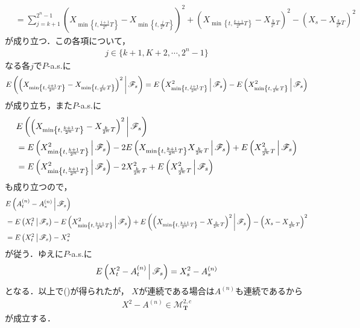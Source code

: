 \begin{sketch}
\begin{description}
\begin{align}
					&= \sum_{j=k+1}^{2^n-1} \left(X_{\min\left\{t,\frac{j+1}{2^n}T\right\}} - X_{\min\left\{t,\frac{j}{2^n}T\right\}}\right)^2
					+ \left(X_{\min\left\{t,\frac{k+1}{2^n}T\right\}} - X_{\frac{k}{2^n}T}\right)^2
					- \left(X_s - X_{\frac{k}{2^n}T}\right)^2
				\end{align}
				が成り立つ．この各項について，
				\begin{align}
					j \in \{k+1,K+2,\cdots,2^n-1\}
				\end{align}
				なる各$j$で$P$-a.s.に
				\begin{align}
					E\left(  \left(X_{\min\left\{t,\frac{j+1}{2^n}T\right\}} - X_{\min\left\{t,\frac{j}{2^n}T\right\}}\right)^2 \, \middle|\, \mathscr{F}_s \right)
					= E\left( X^2_{\min\left\{t,\frac{j+1}{2^n}T\right\}} \, \middle|\, \mathscr{F}_s \right)
					 - E\left( X^2_{\min\left\{t,\frac{j}{2^n}T\right\}} \, \middle|\, \mathscr{F}_s \right)
				\end{align}
				が成り立ち，また$P$-a.s.に
				\begin{align}
					&E\left( \left(X_{\min\left\{t,\frac{k+1}{2^n}T\right\}} - X_{\frac{k}{2^n}T}\right)^2 \, \middle|\, \mathscr{F}_s \right) \\
					&= E\left( X_{\min\left\{t,\frac{k+1}{2^n}T\right\}}^2 \, \middle|\, \mathscr{F}_s \right)
					- 2 E\left( X_{\min\left\{t,\frac{k+1}{2^n}T\right\}}X_{\frac{k}{2^n}T} \, \middle|\, \mathscr{F}_s \right)
					+ E\left( X_{\frac{k}{2^n}T}^2 \, \middle|\, \mathscr{F}_s \right) \\
					&= E\left( X_{\min\left\{t,\frac{k+1}{2^n}T\right\}}^2 \, \middle|\, \mathscr{F}_s \right)
					- 2 X_{\frac{k}{2^n}T}^2
					+ E\left( X_{\frac{k}{2^n}T}^2 \, \middle|\, \mathscr{F}_s \right) \\
				\end{align}
				も成り立つので，
				\begin{align}
					&E\left( A^{(n)}_t - A^{(n)}_s \, \middle|\, \mathscr{F}_s \right) \\
					&= E\left( X^2_t \, \middle|\, \mathscr{F}_s \right)
					- E\left( X^2_{\min\left\{t,\frac{k+1}{2^n}T\right\}} \, \middle|\, \mathscr{F}_s \right)
					+ E\left( \left(X_{\min\left\{t,\frac{k+1}{2^n}T\right\}} - X_{\frac{k}{2^n}T}\right)^2 \, \middle|\, \mathscr{F}_s \right)
					- \left(X_s - X_{\frac{k}{2^n}T}\right)^2 \\
					&= E\left( X^2_t \, \middle|\, \mathscr{F}_s \right) - X_s^2
				\end{align}
				が従う．ゆえに$P$-a.s.に
				\begin{align}
					E\left( X^2_t - A^{(n)}_t \, \middle|\, \mathscr{F}_s \right) = X^2_s - A^{(n)}_s
				\end{align}
				となる．以上で()が得られたが，
				$X$が連続である場合は$A^{(n)}$も連続であるから
				\begin{align}
					X^2 - A^{(n)} \in \mathscr{M}^{2,c}_{\mathbf{T}}
					\label{fom:thm_decomposition_of_square_integrable_martingales_3}
				\end{align}
				が成立する．
				

\end{description}
\end{sketch}
